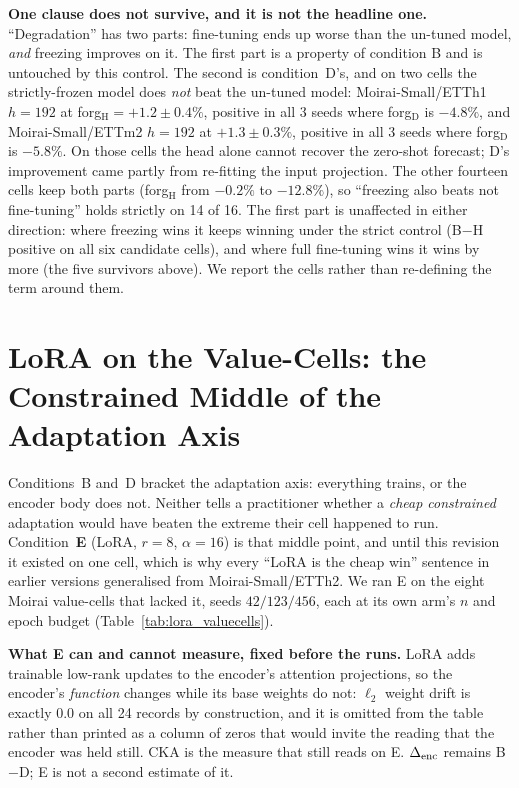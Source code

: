 \textbf{One clause does not survive, and it is not the headline one.}
``Degradation'' has two parts: fine-tuning ends up worse than the un-tuned
model, \emph{and} freezing improves on it. The first part is a property of
condition B and is untouched by this control. The second is condition~D's, and
on two cells the strictly-frozen model does \emph{not} beat the un-tuned model:
Moirai-Small/ETTh1 $h{=}192$ at forg$_\text{H}={+}1.2{\pm}0.4\%$, positive in
all 3 seeds where forg$_\text{D}$ is $-4.8\%$, and Moirai-Small/ETTm2 $h{=}192$
at ${+}1.3{\pm}0.3\%$, positive in all 3 seeds where forg$_\text{D}$ is
$-5.8\%$. On those cells the head alone cannot
recover the zero-shot forecast; D's improvement came partly from re-fitting the
input projection. The other fourteen cells keep both parts (forg$_\text{H}$ from
$-0.2\%$ to $-12.8\%$), so ``freezing also beats not fine-tuning'' holds
strictly on 14 of 16. The first part is unaffected in either direction: where
freezing wins it keeps winning under the strict control (B$-$H positive on all
six candidate cells), and where full fine-tuning wins it wins by more (the five
survivors above). We report the cells rather than re-defining the term around
them.

\section{LoRA on the Value-Cells: the Constrained Middle of the Adaptation Axis}
\label{app:loravaluecells}

Conditions~B and~D bracket the adaptation axis: everything trains, or the
encoder body does not. Neither tells a practitioner whether a \emph{cheap
constrained} adaptation would have beaten the extreme their cell happened to
run. Condition~\textbf{E} (LoRA, $r{=}8$, $\alpha{=}16$) is that middle point,
and until this revision it existed on one cell, which is why every ``LoRA is
the cheap win'' sentence in earlier versions generalised from
Moirai-Small/ETTh2. We ran E on the eight Moirai value-cells that lacked it,
seeds $42/123/456$, each at its own arm's $n$ and epoch budget
(Table~\ref{tab:lora_valuecells}).

\textbf{What E can and cannot measure, fixed before the runs.} LoRA adds
trainable low-rank updates to the encoder's attention projections, so the
encoder's \emph{function} changes while its base weights do not: $\ell_2$ weight
drift is exactly $0.0$ on all 24 records by construction, and it is omitted from
the table rather than printed as a column of zeros that would invite the reading
that the encoder was held still. CKA is the measure that still reads on E. $\Delta_\text{enc}$
remains B$-$D; E is not a second estimate of it.

